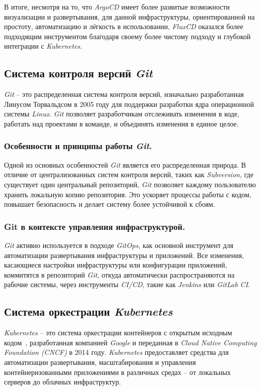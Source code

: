 В итоге, несмотря на то, что \textit{ArgoCD} имеет более развитые возможности визуализации и развертывания, для данной инфраструктуры, ориентированной на простоту, автоматизацию и лёгкость в использовании, \textit{FluxCD} оказался более подходящим инструментом благодаря своему более чистому подходу и глубокой интеграции с \textit{Kubernetes}.

\subsection{Система контроля версий \textit{Git}}
\label{sec:git}
\textit{Git} -- это распределенная система контроля версий, изначально разработанная Линусом Торвальдсом в 2005 году для поддержки разработки ядра операционной системы \textit{Linux}. \textit{Git} позволяет разработчикам отслеживать изменения в коде, работать над проектами в команде, и объединять изменения в единое целое.

\subsubsection{Особенности и принципы работы \textit{Git}.}
Одной из основных особенностей \textit{Git} является его распределенная природа. В отличие от централизованных систем контроля версий, таких как \textit{Subversion}, где существует один центральный репозиторий, \textit{Git} позволяет каждому пользователю хранить локальную копию репозитория. Это ускоряет процессы работы с кодом, повышает безопасность и делает систему более устойчивой к сбоям.

\subsubsection{Git в контексте управления инфраструктурой.}
\textit{Git} активно используется в подходе \textit{GitOps}, как основной инструмент для автоматизации развертывания инфраструктуры и приложений. Все изменения, касающиеся настройки инфраструктуры или конфигурации приложений, коммитятся в репозиторий \textit{Git}, откуда автоматически распространяются на рабочие системы, через инструменты \textit{CI/CD}, такие как \textit{Jenkins} или \textit{GitLab CI}.

\subsection{Система оркестрации \textit{Kubernetes}}
\label{sec:kubernetes}
\textit{Kubernetes} -- это система оркестрации контейнеров с открытым исходным кодом~\cite{kubernetes}, разработанная компанией \textit{Google} и переданная в \textit{Cloud Native Computing Foundation (CNCF)} в 2014 году. \textit{Kubernetes} предоставляет средства для автоматизации развертывания, масштабирования и управления контейнеризованными приложениями в различных средах -- от локальных серверов до облачных инфраструктур.

